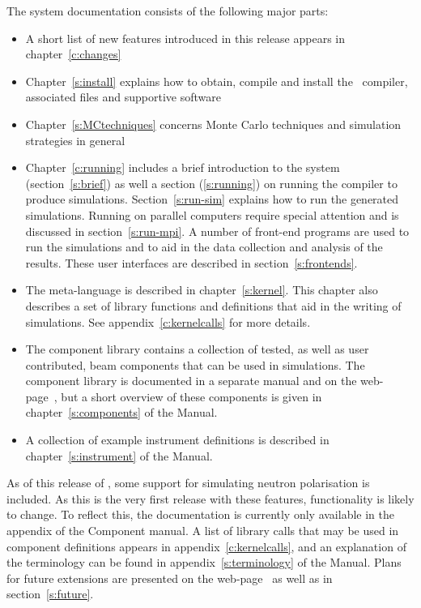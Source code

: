 The \MCX system documentation consists of the following major
parts:
\begin{itemize}
\item A short list of new features introduced in this \MCX release
  appears in chapter~\ref{c:changes}
\item Chapter~\ref{s:install} explains how to obtain, compile
  and install the \MCX\ compiler, associated files and supportive software
\item Chapter~\ref{s:MCtechniques} concerns Monte Carlo techniques
  and simulation strategies in general
\item Chapter~\ref{c:running} includes a brief introduction to the
  \MCX system
  (section~\ref{s:brief}) as well a section (\ref{s:running}) on running the compiler to produce
  simulations. Section~\ref{s:run-sim} explains how to run the generated
  simulations. Running \MCX on parallel computers require special
  attention and is discussed in section~\ref{s:run-mpi}. A number of front-end programs are used to run the
  simulations and to aid in the data collection and analysis of the
  results. These user interfaces are described in section~\ref{s:frontends}.
\item The \MCX meta-language is described in chapter~\ref{s:kernel}. This
  chapter also describes a set of library functions and definitions
  that aid in the writing of simulations. See
  appendix~\ref{c:kernelcalls} for more details.
\item The \MCX component library contains a collection of
  tested, as well as user contributed, beam components that can be used in simulations.
  The \MCX component library is documented in a separate manual
  and on the \MCX web-page~\cite{mcxtrace_webpage}, but a short overview of these
  components is given in chapter~\ref{s:components} of the Manual.
\item A collection of example instrument definitions is described in
  chapter~\ref{s:instrument} of the Manual.%

\end{itemize}

As of this release of \MCX, some support for simulating neutron
polarisation is included. As this is the very first release with these
features, functionality is likely to change. To reflect this, the
documentation is currently only available in the appendix of the Component manual. %
A list of library calls that may be used in component definitions
appears in appendix~\ref{c:kernelcalls}, and
an explanation of the \MCX terminology can be
found in appendix~\ref{s:terminology} of the Manual.
Plans for future extensions are presented on the \MCX web-page~\cite{mcxtrace_webpage} as well as in section~\ref{s:future}.


